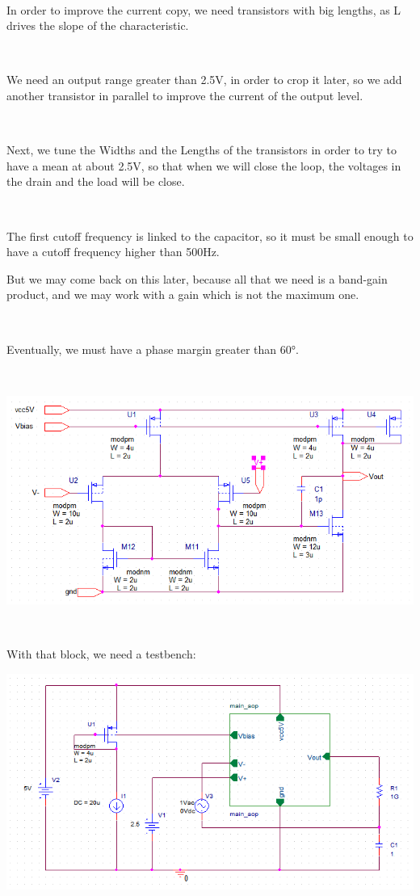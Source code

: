 \documentclass{article}
\begin{document}
~

In order to improve the current copy, we need transistors with big lengths, as L drives the slope of the characteristic.

~

We need an output range  greater than 2.5V, in order to crop it later, so we add another transistor in parallel to improve the current of the output level.

~

Next, we tune the Widths and the Lengths of the transistors in order to try to have a mean at about 2.5V, so that when we will
close the loop, the voltages in the drain and the load will be close.

~

The first cutoff frequency is linked to the capacitor, so it must be small enough to have a cutoff frequency higher than 500Hz.

But we may come back on this later, because all that we need is a band-gain product, and we may work with a gain which is not the maximum one.

~

Eventually, we must have a phase margin greater than 60°.

~

\includegraphics[width=15cm]{AOP.png}

~

With that block, we need a testbench:

\includegraphics[width=15cm]{test_AOP.png}
\end{document}
